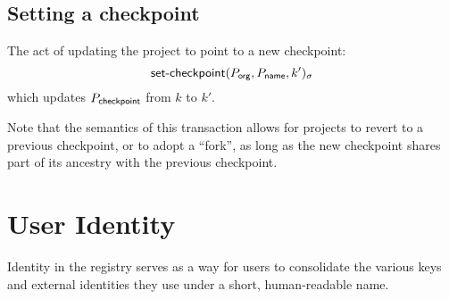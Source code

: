 \subsection{Setting a checkpoint}
The act of updating the project to point to a new checkpoint:
\[
    \operatorname{\mathsf{set-checkpoint}}\lparen P_{\mathsf{org}}, P_{\mathsf{name}}, k'\rparen_\sigma
\]
which updates $P_{\mathsf{checkpoint}}$ from $k$ to $k'$.

Note that the semantics of this transaction allows for projects to revert to
a previous checkpoint, or to adopt a ``fork'', as long as the new checkpoint
shares part of its ancestry with the previous checkpoint.

\section{User Identity}

Identity in the registry serves as a way for users to consolidate the various
keys and external identities they use under a short, human-readable name.

